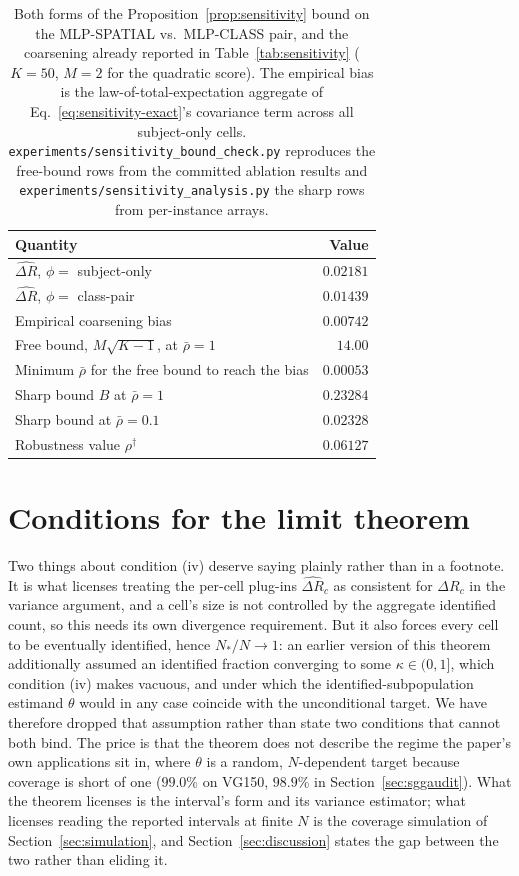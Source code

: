 \begin{table}[t]
\centering
\caption{Both forms of the Proposition~\ref{prop:sensitivity} bound on the
MLP-SPATIAL vs.\ MLP-CLASS pair, and the coarsening already reported in
Table~\ref{tab:sensitivity} ($K=50$, $M=2$ for the quadratic score). The empirical bias
is the law-of-total-expectation aggregate of Eq.~\eqref{eq:sensitivity-exact}'s covariance
term across all subject-only cells.
\texttt{experiments/sensitivity\_bound\_check.py} reproduces the free-bound rows from the
committed ablation results and \texttt{experiments/sensitivity\_analysis.py} the sharp
rows from per-instance arrays.}
\label{tab:sensitivity-numeric}
\begin{tabular}{lr}
\toprule
Quantity & Value \\
\midrule
$\widehat{\Delta R}$, $\phi=$ subject-only & $0.02181$ \\
$\widehat{\Delta R}$, $\phi=$ class-pair & $0.01439$ \\
Empirical coarsening bias & $0.00742$ \\
\midrule
Free bound, $M\sqrt{K-1}$, at $\bar\rho=1$ & $14.00$ \\
Minimum $\bar\rho$ for the free bound to reach the bias & $0.00053$ \\
\midrule
Sharp bound $B$ at $\bar\rho=1$ & $0.23284$ \\
Sharp bound at $\bar\rho=0.1$ & $0.02328$ \\
Robustness value $\rho^\dagger$ & $0.06127$ \\
\bottomrule
\end{tabular}
\end{table}

\section{Conditions for the limit theorem}\label{app:clt}

Two things about condition (iv) deserve saying plainly rather than in a footnote. It is
what licenses treating the per-cell plug-ins $\widehat{\Delta R}_c$ as consistent for
$\Delta R_c$ in the variance argument, and a cell's size is not controlled by the
aggregate identified count, so this needs its own divergence requirement. But it also
forces every cell to be eventually identified, hence $N_*/N\to1$: an earlier version of
this theorem additionally assumed an identified fraction converging to some
$\kappa\in(0,1]$, which condition (iv) makes vacuous, and under which the
identified-subpopulation estimand $\theta$ would in any case coincide with the
unconditional target. We have therefore dropped that assumption rather than state two
conditions that cannot both bind. The price is that the theorem does not describe the
regime the paper's own applications sit in, where $\theta$ is a random, $N$-dependent
target because coverage is short of one ($99.0\%$ on VG150, $98.9\%$ in
Section~\ref{sec:sggaudit}). What the theorem licenses is the interval's form and its
variance estimator; what licenses reading the reported intervals at finite $N$ is the
coverage simulation of Section~\ref{sec:simulation}, and Section~\ref{sec:discussion}
states the gap between the two rather than eliding it.

